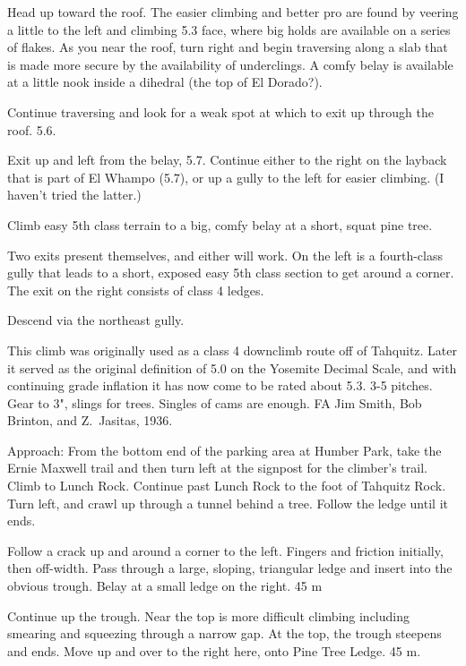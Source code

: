 \documentclass{tahquitz}
\begin{document}
 Head up toward the roof. The easier climbing and better pro are found
by veering a little to the left and climbing 5.3 face, where big holds are available on a series of flakes.
As you near the roof, turn right and begin traversing
along a slab that is made more secure by the availability of underclings. A comfy
belay is available at a little nook inside a dihedral (the top of El Dorado?).

 Continue traversing and look for a weak spot at which to exit up through the roof. 5.6.

 Exit up and left from the belay, 5.7. Continue either to the right on the layback
that is part of El Whampo (5.7), or up a gully to the left for easier climbing. (I haven't tried
the latter.)

 Climb easy 5th class terrain to a big, comfy belay at a short, squat pine tree.

 Two exits present themselves, and either will work. On the left is a fourth-class
gully that leads to a short, exposed easy 5th class section to get around a corner.
The exit on the right consists of class 4 ledges.

Descend via the northeast gully.




This climb was originally used as a class 4 downclimb route off of Tahquitz.
Later it served as the original definition of 5.0 on the Yosemite Decimal
Scale, and with continuing grade inflation it has now come to be
rated about 5.3. 3-5 pitches. Gear to 3",
slings for trees. Singles of cams are enough.
FA Jim Smith, Bob Brinton, and Z.~Jasitas, 1936.

Approach: From the bottom end of the parking area at Humber Park,
take the Ernie Maxwell trail and then turn left at the signpost for
the climber's trail. Climb to Lunch Rock. Continue past Lunch Rock to
the foot of Tahquitz Rock. Turn left, and crawl up through a tunnel
behind a tree. Follow the ledge until it ends.

 Follow a crack up and around a corner to the left. Fingers and
friction initially, then off-width. Pass through a large, sloping,
triangular ledge and insert into the obvious trough. Belay at a small
ledge on the right. 45 m

 Continue up the trough. Near the top is more difficult climbing
including smearing and squeezing through a narrow gap. At the top,
the trough steepens and ends. Move up and over to the right here,
onto Pine Tree Ledge. 45 m.
\end{document}
